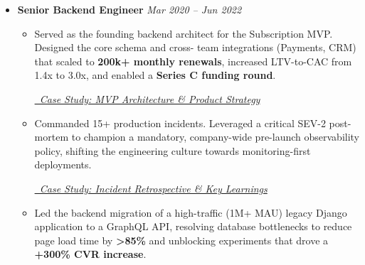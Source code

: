 \documentclass[a4paper,11pt]{article}
\begin{document}
\begin{itemize}[leftmargin=*, topsep=4pt, partopsep=0pt, itemsep=8pt, parsep=0pt]
\begin{itemize}[leftmargin=1.5em, topsep=2pt, itemsep=4pt]
        \item Advocated against a high-risk monolithic launch strategy (``Subs Direct''), ultimately guiding a cross-functional pivot to an iterative release model, saving an estimated 6 months of engineering effort.
    \end{itemize}
        
        \item \textbf{Senior Backend Engineer} \hfill \textit{Mar 2020 – Jun 2022}
            \begin{itemize}[leftmargin=1.5em, topsep=2pt, itemsep=4pt]
                \item Served as the founding backend architect for the Subscription MVP. Designed the core schema and cross- team integrations (Payments, CRM) that scaled to \textbf{200k+ monthly renewals}, increased LTV-to-CAC from 1.4x to 3.0x, and enabled a \textbf{Series C funding round}.

                    \vspace{-1.7em}
                    \begin{flushright}
                    \href{https://www.isaacbernat.com/cv#casestudy-subscription-model}{\textit{\small \faArrowCircleRight\ Case Study: MVP Architecture & Product Strategy}}
                    \end{flushright}

                \item Commanded 15+ production incidents. Leveraged a critical SEV-2 post-mortem to champion a mandatory, company-wide pre-launch observability policy, shifting the engineering culture towards monitoring-first deployments.

                    \vspace{-1.7em}
                    \begin{flushright}
                    \href{https://www.isaacbernat.com/cv#casestudy-incident-74}{\textit{\small \faArrowCircleRight\ Case Study: Incident Retrospective \& Key Learnings}}
                    \end{flushright}

                \item Led the backend migration of a high-traffic (1M+ MAU) legacy Django application to a GraphQL API, resolving database bottlenecks to reduce page load time by\textbf{ \textgreater 85\%} and unblocking experiments that drove a \textbf{+300\% CVR increase}.
            \end{itemize}
    \end{itemize}
\end{document}

